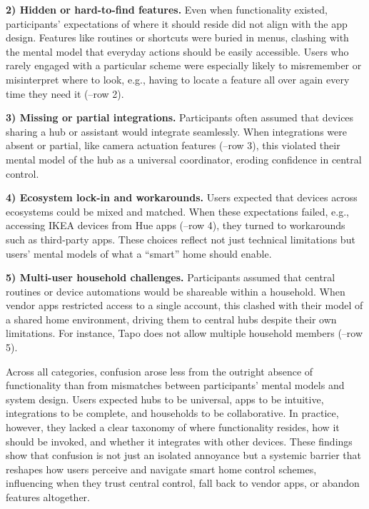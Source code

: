\noindent\textbf{2) Hidden or hard-to-find features.}  
Even when functionality existed, participants' expectations of where it should reside did not align with the app design. Features like routines or shortcuts were buried in menus, clashing with the mental model that everyday actions should be easily accessible. Users who rarely engaged with a particular scheme were especially likely to misremember or misinterpret where to look, e.g., having to locate a feature all over again every time they need it (--row 2). 

\noindent\textbf{3) Missing or partial integrations.}  
Participants often assumed that devices sharing a hub or assistant would integrate seamlessly. When integrations were absent or partial, like camera actuation features (--row 3), this violated their mental model of the hub as a universal coordinator, eroding confidence in central control. 

\noindent\textbf{4) Ecosystem lock-in and workarounds.}  
Users expected that devices across ecosystems could be mixed and matched. When these expectations failed, e.g., accessing IKEA devices from Hue apps (--row 4), they turned to workarounds such as third-party apps. These choices reflect not just technical limitations but users' mental models of what a ``smart'' home should enable. 

\noindent\textbf{5) Multi-user household challenges.}  
Participants assumed that central routines or device automations would be shareable within a household. When vendor apps restricted access to a single account, this clashed with their model of a shared home environment, driving them to central hubs despite their own limitations. For instance, Tapo does not allow multiple household members (--row 5). 

Across all categories, confusion arose less from the outright absence of functionality than from mismatches between participants' mental models and system design. Users expected hubs to be universal, apps to be intuitive, integrations to be complete, and households to be collaborative. In practice, however, they lacked a clear taxonomy of where functionality resides, how it should be invoked, and whether it integrates with other devices. These findings show that confusion is not just an isolated annoyance but a systemic barrier that reshapes how users perceive and navigate smart home control schemes, influencing when they trust central control, fall back to vendor apps, or abandon features altogether.

